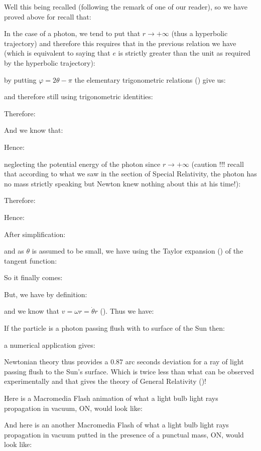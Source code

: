 	Well this being recalled (following the remark of one of our reader), so we have proved above for recall that:
	
	In the case of a photon, we tend to put that $r\rightarrow +\infty$ (thus a hyperbolic trajectory) and therefore this requires that in the previous relation we have (which is equivalent to saying that $e$ is strictly greater than the unit as required by the hyperbolic trajectory):
	
	by putting $\varphi=2\theta-\pi$ the elementary trigonometric relations () give us:
	
	and therefore still using trigonometric identities:
	
	Therefore:
	
	And we know that:
	
	Hence:
	
	neglecting the potential energy of the photon since $r\rightarrow +\infty$ (caution !!! recall that according to what we saw in the section of Special Relativity, the photon has no mass strictly speaking but Newton knew nothing about this at his time!):
	
	Therefore:
	
	Hence:
	
	After simplification:
	
	and as $\theta$ is assumed to be small, we have using the Taylor expansion () of the tangent function:
	
	So it finally comes:
	
	But, we have by definition:
	
	and we know that $v=\omega r=\dot{\theta}r$ (). Thus we have:
	
	If the particle is a photon passing flush with to surface of the Sun then:
	
	a numerical application gives:
	
	Newtonian theory thus provides a $0.87$ arc seconds deviation for a ray of light passing flush to the Sun's surface. Which is twice less than what can be observed experimentally and that gives the theory of General Relativity ()!
	
	Here is a Macromedia Flash animation of what a light bulb light rays propagation in vacuum, ON, would look like:
	\begin{center}
	\centering
	\end{center}
	And here is an another Macromedia Flash of what a light bulb light rays propagation in vacuum putted in the presence of a punctual mass, ON, would look like:
	\begin{center}
	\centering
	\end{center}
	
